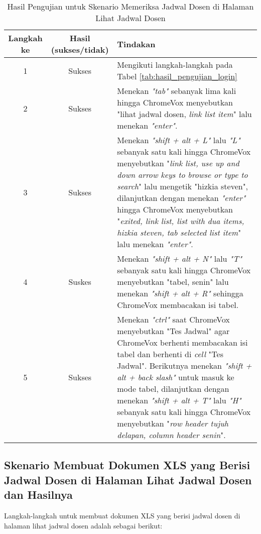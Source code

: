 \begin{table}[H]
    \centering 
    \caption{Hasil Pengujian untuk Skenario Memeriksa Jadwal Dosen di Halaman Lihat Jadwal Dosen}
    \label{tab:hasil_pengujian_memeriksa_jadwal_dosen_di_halaman_lihat_jadwal_dosen}
    \begin{tabular}{|c|c|p{10cm}|}
        \toprule
        Langkah ke & Hasil (sukses/tidak) & Tindakan \\

        \midrule
        1 & Sukses & Mengikuti langkah-langkah pada Tabel \ref{tab:hasil_pengujian_login} \\
        2 & Sukses & Menekan \textit{"tab"} sebanyak lima kali hingga ChromeVox menyebutkan "lihat jadwal dosen, \textit{link list item}" lalu menekan \textit{"enter"}. \\
        3 & Sukses & Menekan \textit{"shift + alt + L"} lalu \textit{"L"} sebanyak satu kali hingga ChromeVox menyebutkan "\textit{link list, use up and down arrow keys to browse or type to search}" lalu mengetik "hizkia steven", dilanjutkan dengan menekan \textit{"enter"} hingga ChromeVox menyebutkan "\textit{exited, link list, list with dua items, hizkia steven, tab selected list item}" lalu menekan \textit{"enter"}. \\
        4 & Suskes & Menekan \textit{"shift + alt + N"} lalu \textit{"T"} sebanyak satu kali hingga ChromeVox menyebutkan "tabel, senin" lalu menekan \textit{"shift + alt + R"} sehingga ChromeVox membacakan isi tabel. \\
        5 & Sukses & Menekan \textit{"ctrl"} saat ChromeVox menyebutkan "Tes Jadwal" agar ChromeVox berhenti membacakan isi tabel dan berhenti di \textit{cell} "Tes Jadwal". Berikutnya menekan \textit{"shift + alt + back slash"} untuk masuk ke mode tabel, dilanjutkan dengan menekan \textit{"shift + alt + T"} lalu \textit{"H"} sebanyak satu kali hingga ChromeVox menyebutkan "\textit{row header tujuh delapan, column header senin}". \\

        \bottomrule

    \end{tabular}
\end{table}

\subsection{Skenario Membuat Dokumen XLS yang Berisi Jadwal Dosen di Halaman Lihat Jadwal Dosen dan Hasilnya}
\label{subsec:skenario_membuat_dokumen_xls_yang_berisi_jadwal_dosen_di_halaman_lihat_jadwal_dosen}
Langkah-langkah untuk membuat dokumen XLS yang berisi jadwal dosen di halaman lihat jadwal dosen adalah sebagai berikut:

